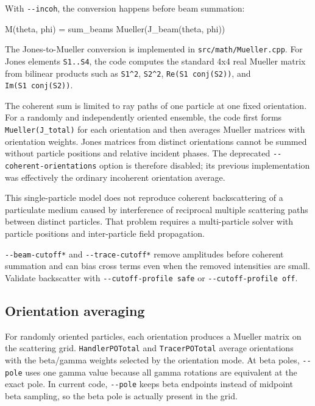 \documentclass[
  10pt,
  a4paper,
]{article}
\newenvironment{Shaded}{}{}
\newcommand{\NormalTok}[1]{#1}
\begin{document}
With \texttt{-\/-incoh}, the conversion happens before beam summation:

\begin{Shaded}
\begin{Highlighting}[]
\NormalTok{M(theta, phi) = sum\_beams Mueller(J\_beam(theta, phi))}
\end{Highlighting}
\end{Shaded}

The Jones-to-Mueller conversion is implemented in
\texttt{src/math/Mueller.cpp}. For Jones elements \texttt{S1..S4}, the
code computes the standard 4x4 real Mueller matrix from bilinear
products such as \texttt{\textbar{}S1\textbar{}\^{}2},
\texttt{\textbar{}S2\textbar{}\^{}2}, \texttt{Re(S1\ conj(S2))}, and
\texttt{Im(S1\ conj(S2))}.

The coherent sum is limited to ray paths of one particle at one fixed
orientation. For a randomly and independently oriented ensemble, the
code first forms \texttt{Mueller(J\_total)} for each orientation and then
averages Mueller matrices with orientation weights. Jones matrices from
distinct orientations cannot be summed without particle positions and
relative incident phases. The deprecated
\texttt{-\/-coherent-orientations} option is therefore disabled; its
previous implementation was effectively the ordinary incoherent
orientation average.

This single-particle model does not reproduce coherent backscattering of
a particulate medium caused by interference of reciprocal multiple
scattering paths between distinct particles. That problem requires a
multi-particle solver with particle positions and inter-particle field
propagation.

\texttt{-\/-beam-cutoff*} and \texttt{-\/-trace-cutoff*} remove
amplitudes before coherent summation and can bias cross terms even when
the removed intensities are small. Validate backscatter with
\texttt{-\/-cutoff-profile safe} or \texttt{-\/-cutoff-profile off}.

\subsection{Orientation averaging}\label{orientation-averaging}

For randomly oriented particles, each orientation produces a Mueller
matrix on the scattering grid. \texttt{HandlerPOTotal} and
\texttt{TracerPOTotal} average orientations with the beta/gamma weights
selected by the orientation mode. At beta poles, \texttt{-\/-pole} uses
one gamma value because all gamma rotations are equivalent at the exact
pole. In current code, \texttt{-\/-pole} keeps beta endpoints instead of
midpoint beta sampling, so the beta pole is actually present in the
grid.
\end{document}
